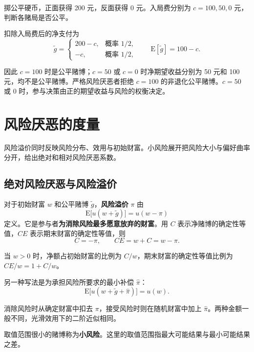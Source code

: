 \begin{tcolorbox}[example,title=课堂例题：入局费与公平赌博]
\begin{question}
掷公平硬币，正面获得 200 元，反面获得 0 元。入局费分别为 $c=100,50,0$ 元，判断各赌局是否公平。
\end{question}
\begin{solution}[blank-type=manual,blank-vsep=3\baselineskip]
扣除入局费后的净支付为
\[
 \tilde g=\begin{cases}200-c,&\text{概率 }1/2,\\-c,&\text{概率 }1/2,\end{cases}
 \qquad \mathrm E[\tilde g]=100-c.
\]

因此 $c=100$ 时是公平赌博；$c=50$ 或 $c=0$ 时净期望收益分别为 50 元和 100 元，均不是公平赌博。严格风险厌恶者拒绝 $c=100$ 的非退化公平赌博。$c=50$ 或 $0$ 时，参与决策由正的期望收益与风险的权衡决定。
\end{solution}
\end{tcolorbox}

\section{风险厌恶的度量}\label{sec:wj-seven-3}
风险溢价同时反映风险分布、效用与初始财富。小风险展开把风险大小与偏好曲率分开，给出绝对和相对风险厌恶系数。

\subsection{绝对风险厌恶与风险溢价}

\begin{tcolorbox}[knowledge]
 对于初始财富 $w$ 和公平赌博 $\tilde{g}$，\textbf{风险溢价} $\pi$ 由
\begin{equation}
    \mathrm{E}\bigl[u(w+\tilde{g})\bigr]=u(w-\pi)
\label{eq:wj-seven-1}
\end{equation}
定义。它是参与者\textbf{为消除风险最多愿意放弃的财富}。用 $C$ 表示净赌博的确定性等值，$CE$ 表示期末财富的确定性等值，则
\[
 C=-\pi,\qquad CE=w+C=w-\pi.
\]

当 $w>0$ 时，净额占初始财富的比例为 $C/w$，期末财富的确定性等值比例为 $CE/w=1+C/w$。

另一种写法是为承担风险所要求的最小补偿 $\hat{\pi}$：
\[
    \mathrm{E}\bigl[u(w+\tilde{g}+\hat{\pi})\bigr]=u(w).
\]

消除风险时从确定财富中扣去 $\pi$，接受风险时则在随机财富中加上 $\hat\pi$。两种金额一般不同，光滑效用下的二阶近似相同。

 取值范围很小的赌博称为\textbf{小风险}。这里的取值范围指最大可能结果与最小可能结果之差。
\end{tcolorbox}

